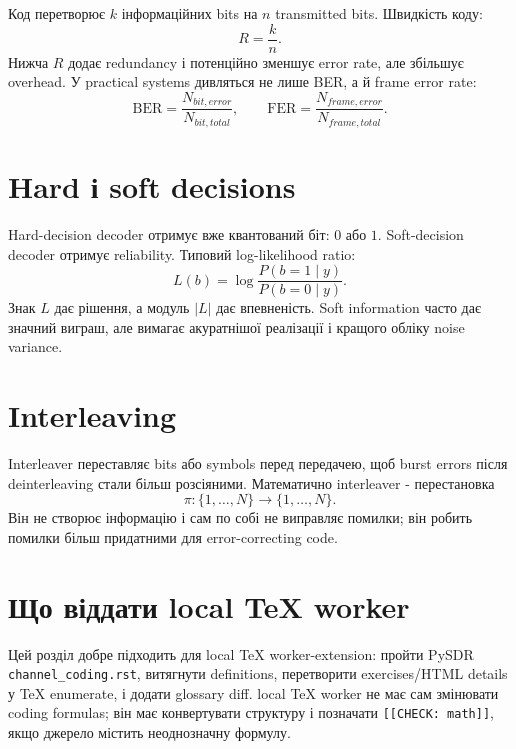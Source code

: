 Код перетворює $k$ інформаційних bits на $n$ transmitted bits. Швидкість коду:
\[
  R=\frac{k}{n}.
\]
Нижча $R$ додає redundancy і потенційно зменшує error rate, але збільшує overhead. У practical systems дивляться не лише BER, а й frame error rate:
\[
  \mathrm{BER}=\frac{N_{bit,error}}{N_{bit,total}},\qquad
  \mathrm{FER}=\frac{N_{frame,error}}{N_{frame,total}}.
\]

\section{Hard і soft decisions}

Hard-decision decoder отримує вже квантований біт: $0$ або $1$. Soft-decision decoder отримує reliability. Типовий log-likelihood ratio:
\[
  L(b)=\log\frac{P(b=1\mid y)}{P(b=0\mid y)}.
\]
Знак $L$ дає рішення, а модуль $|L|$ дає впевненість. Soft information часто дає значний виграш, але вимагає акуратнішої реалізації і кращого обліку noise variance.

\section{Interleaving}

Interleaver переставляє bits або symbols перед передачею, щоб burst errors після deinterleaving стали більш розсіяними. Математично interleaver - перестановка
\[
  \pi:\{1,\ldots,N\}\to\{1,\ldots,N\}.
\]
Він не створює інформацію і сам по собі не виправляє помилки; він робить помилки більш придатними для error-correcting code.

\section{Що віддати local TeX worker}

Цей розділ добре підходить для local TeX worker-extension: пройти PySDR \texttt{channel\_coding.rst}, витягнути definitions, перетворити exercises/HTML details у TeX enumerate, і додати glossary diff. local TeX worker не має сам змінювати coding formulas; він має конвертувати структуру і позначати \texttt{[[CHECK: math]]}, якщо джерело містить неоднозначну формулу.

